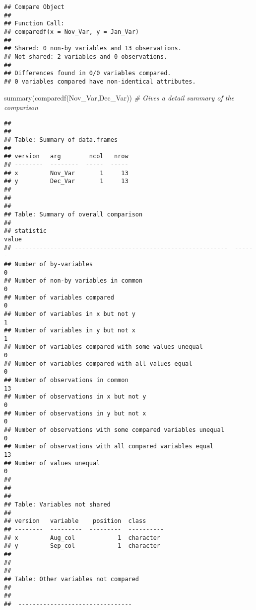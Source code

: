 \documentclass[
]{article}
\newenvironment{Shaded}{\begin{snugshade}}{\end{snugshade}}
\newcommand{\CommentTok}[1]{\textcolor[rgb]{0.56,0.35,0.01}{\textit{#1}}}
\newcommand{\FunctionTok}[1]{\textcolor[rgb]{0.00,0.00,0.00}{#1}}
\newcommand{\NormalTok}[1]{#1}
\begin{document}
\begin{verbatim}
## Compare Object
## 
## Function Call: 
## comparedf(x = Nov_Var, y = Jan_Var)
## 
## Shared: 0 non-by variables and 13 observations.
## Not shared: 2 variables and 0 observations.
## 
## Differences found in 0/0 variables compared.
## 0 variables compared have non-identical attributes.
\end{verbatim}

\begin{Shaded}
\begin{Highlighting}[]
 \FunctionTok{summary}\NormalTok{(}\FunctionTok{comparedf}\NormalTok{(Nov\_Var,Dec\_Var)) }\CommentTok{\# Gives a detail summary of the comparison}
\end{Highlighting}
\end{Shaded}

\begin{verbatim}
## 
## 
## Table: Summary of data.frames
## 
## version   arg        ncol   nrow
## --------  --------  -----  -----
## x         Nov_Var       1     13
## y         Dec_Var       1     13
## 
## 
## 
## Table: Summary of overall comparison
## 
## statistic                                                      value
## ------------------------------------------------------------  ------
## Number of by-variables                                             0
## Number of non-by variables in common                               0
## Number of variables compared                                       0
## Number of variables in x but not y                                 1
## Number of variables in y but not x                                 1
## Number of variables compared with some values unequal              0
## Number of variables compared with all values equal                 0
## Number of observations in common                                  13
## Number of observations in x but not y                              0
## Number of observations in y but not x                              0
## Number of observations with some compared variables unequal        0
## Number of observations with all compared variables equal          13
## Number of values unequal                                           0
## 
## 
## 
## Table: Variables not shared
## 
## version   variable    position  class     
## --------  ---------  ---------  ----------
## x         Aug_col            1  character 
## y         Sep_col            1  character 
## 
## 
## 
## Table: Other variables not compared
## 
##                                  
##  --------------------------------

\end{verbatim}
\end{document}
